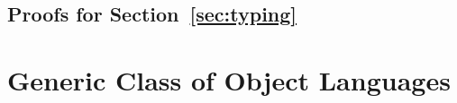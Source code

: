 \documentclass[sigplan,10pt, anonymous]{acmart}
\newenvironment{LibCode*}{%
  \begin{tcolorbox}[%
    colframe=white,%
    boxrule=0.0pt,%
    top=2.5pt,%
    left=2.5pt,%
    bottom=2.5pt,%
    right=2.5pt,%
    boxsep=0pt%
  ]\vspace{-0.2\baselineskip}%
}{%
  \vspace{-1\baselineskip}%
  \end{tcolorbox}%
}
\newcommand*\LibCode[1]{\begin{LibCode*}{#1}\end{LibCode*}}
\newcommand*\AppCode[1]{{#1}}
\begin{document}
  \LibCode\KCommLiftWeakenTraverse
  \LibCode\KCommLiftWeakenTraverseProof

  \LibCode\KWeakenCancelsSingle
  \LibCode\KWeakenCancelsSingleProof

  \LibCode\KWeakenCancelsSingleTraverse
  \LibCode\KWeakenCancelsSingleTraverseProof

  \LibCode\KDistLiftSingle
  \LibCode\KDistLiftSingleProof

  \LibCode\KDistLiftSingleTraverse
  \LibCode\KDistLiftSingleTraverseProof




  \subsection{Proofs for Section~\ref{sec:typing}}
  \LibCode\KLiftTyping
  \LibCode\KLiftTypingProof

  \LibCode\KSingleTyping
  \LibCode\KSingleTypingProof




  \section{Generic Class of Object Languages}
  \label{sec:generic-class}
\end{document}
